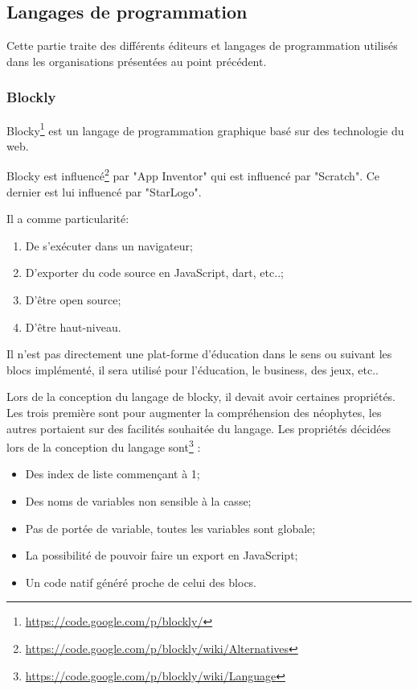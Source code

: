 \subsection{Langages de programmation}
Cette partie traite des différents éditeurs et langages de programmation utilisés dans les organisations présentées au point précédent.
\subsubsection{Blockly}
\label{blockly}
Blocky\footnote{\url{https://code.google.com/p/blockly/}} est un langage de programmation graphique basé sur des technologie du web. 

Blocky est influencé\footnote{\url{https://code.google.com/p/blockly/wiki/Alternatives}} par "App Inventor" qui est influencé par "Scratch". Ce dernier est lui influencé par "StarLogo".

Il a comme particularité:
\begin{enumerate}
\item De s'exécuter dans un navigateur;
\item D'exporter du code source en JavaScript, dart, etc..;
\item D'être open source;
\item D'être haut-niveau.
\end{enumerate}

Il n'est pas directement une plat-forme d'éducation dans le sens ou suivant les blocs implémenté, il sera utilisé pour l'éducation, le business, des jeux, etc..

Lors de la conception du langage de blocky, il devait avoir certaines propriétés. Les trois première sont pour augmenter la compréhension des néophytes, les autres portaient sur des facilités souhaitée du langage. Les propriétés décidées lors de la conception du langage sont\footnote{\url{https://code.google.com/p/blockly/wiki/Language}} :

\begin{itemize}
  \item Des index de liste commençant à 1;
  \item Des noms de variables non sensible à la casse;
  \item Pas de portée de variable, toutes les variables sont globale;
  \item La possibilité de pouvoir faire un export en JavaScript;
  \item Un code natif généré proche de celui des blocs.
\end{itemize}

